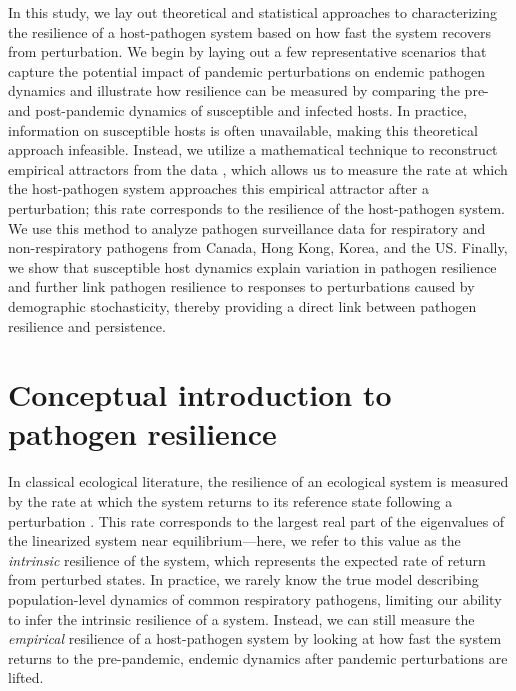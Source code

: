 \documentclass[12pt]{article}
\begin{document}
In this study, we lay out theoretical and statistical approaches to characterizing the resilience of a host-pathogen system based on how fast the system recovers from perturbation.
We begin by laying out a few representative scenarios that capture the potential impact of pandemic perturbations on endemic pathogen dynamics and illustrate how resilience can be measured by comparing the pre- and post-pandemic dynamics of susceptible and infected hosts.
In practice, information on susceptible hosts is often unavailable, making this theoretical approach infeasible.
Instead, we utilize a mathematical technique to reconstruct empirical attractors from the data \citep{takens2006detecting}, which allows us to measure the rate at which the host-pathogen system approaches this empirical attractor after a perturbation;
this rate corresponds to the resilience of the host-pathogen system.
We use this method to analyze pathogen surveillance data for respiratory and non-respiratory pathogens from Canada, Hong Kong, Korea, and the US.
Finally, we show that susceptible host dynamics explain variation in pathogen resilience and further link pathogen resilience to responses to perturbations caused by demographic stochasticity, thereby providing a direct link between pathogen resilience and persistence. 
 
\section*{Conceptual introduction to pathogen resilience}

In classical ecological literature, the resilience of an ecological system is measured by the rate at which the system returns to its reference state following a perturbation \citep{pimm1979structure, neubert1997alternatives,gunderson2000ecological,dakos2022ecological}.
This rate corresponds to the largest real part of the eigenvalues of the linearized system near equilibrium---here, we refer to this value as the \emph{intrinsic} resilience of the system, which represents the expected rate of return from perturbed states.
In practice, we rarely know the true model describing population-level dynamics of common respiratory pathogens, limiting our ability to infer the intrinsic resilience of a system.
Instead, we can still measure the \emph{empirical} resilience of a host-pathogen system by looking at how fast the system returns to the pre-pandemic, endemic dynamics after pandemic perturbations are lifted.
\end{document}
